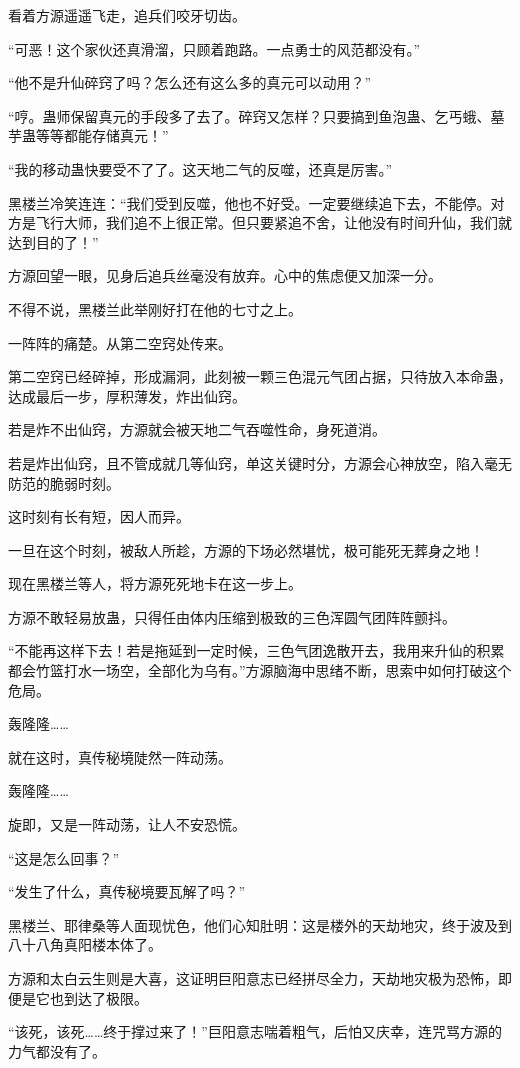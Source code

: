 \begin{this_body}
看着方源遥遥飞走，追兵们咬牙切齿。

“可恶！这个家伙还真滑溜，只顾着跑路。一点勇士的风范都没有。”

“他不是升仙碎窍了吗？怎么还有这么多的真元可以动用？”

“哼。蛊师保留真元的手段多了去了。碎窍又怎样？只要搞到鱼泡蛊、乞丐蛾、墓芋蛊等等都能存储真元！”

“我的移动蛊快要受不了了。这天地二气的反噬，还真是厉害。”

黑楼兰冷笑连连：“我们受到反噬，他也不好受。一定要继续追下去，不能停。对方是飞行大师，我们追不上很正常。但只要紧追不舍，让他没有时间升仙，我们就达到目的了！”

方源回望一眼，见身后追兵丝毫没有放弃。心中的焦虑便又加深一分。

不得不说，黑楼兰此举刚好打在他的七寸之上。

一阵阵的痛楚。从第二空窍处传来。

第二空窍已经碎掉，形成漏洞，此刻被一颗三色混元气团占据，只待放入本命蛊，达成最后一步，厚积薄发，炸出仙窍。

若是炸不出仙窍，方源就会被天地二气吞噬性命，身死道消。

若是炸出仙窍，且不管成就几等仙窍，单这关键时分，方源会心神放空，陷入毫无防范的脆弱时刻。

这时刻有长有短，因人而异。

一旦在这个时刻，被敌人所趁，方源的下场必然堪忧，极可能死无葬身之地！

现在黑楼兰等人，将方源死死地卡在这一步上。

方源不敢轻易放蛊，只得任由体内压缩到极致的三色浑圆气团阵阵颤抖。

“不能再这样下去！若是拖延到一定时候，三色气团逸散开去，我用来升仙的积累都会竹篮打水一场空，全部化为乌有。”方源脑海中思绪不断，思索中如何打破这个危局。

轰隆隆……

就在这时，真传秘境陡然一阵动荡。

轰隆隆……

旋即，又是一阵动荡，让人不安恐慌。

“这是怎么回事？”

“发生了什么，真传秘境要瓦解了吗？”

黑楼兰、耶律桑等人面现忧色，他们心知肚明：这是楼外的天劫地灾，终于波及到八十八角真阳楼本体了。

方源和太白云生则是大喜，这证明巨阳意志已经拼尽全力，天劫地灾极为恐怖，即便是它也到达了极限。

“该死，该死……终于撑过来了！”巨阳意志喘着粗气，后怕又庆幸，连咒骂方源的力气都没有了。


\end{this_body}
